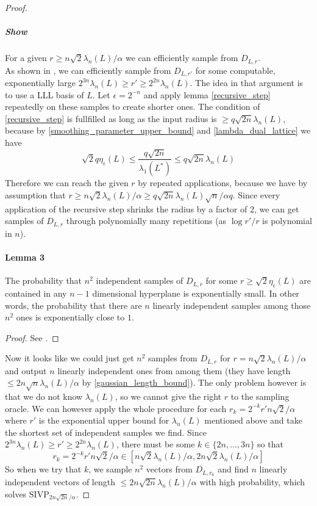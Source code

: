 \begin{proof}
\subparagraph{Show} For a given $r \geq n \sqrt{2}\lambda_n(L)/\alpha$ we can efficiently sample from $D_{L, r}$. \\
As shown in \cite{Reg}, we can efficiently sample from $D_{L, r'}$ for some computable, exponentially large $2^{3n}\lambda_n(L) \geq r' \geq 2^{2n} \lambda_n(L)$. The idea in that argument is to use a LLL basis of $L$. Let $\epsilon = 2^{-n}$ and apply lemma \ref{recursive_step} repeatedly on these samples to create shorter ones. The condition of \ref{recursive_step} is fullfilled as long as the input radius is $\geq q \sqrt{2n} \lambda_n(L)$, because by \ref{smoothing_parameter_upper_bound} and \ref{lambda_dual_lattice} we have
\begin{equation}
\sqrt{2}q\eta_\epsilon(L) \leq \frac {q \sqrt{2n}} {\lambda_1(L^*)} \leq q \sqrt{2n} \lambda_n(L) \nonumber
\end{equation}
Therefore we can reach the given $r$ by repeated applications, because we have by assumption that $r \geq n\sqrt{2}\lambda_n(L)/\alpha \geq q \sqrt{2n} \lambda_n(L) \sqrt{n}/\alpha q$.
Since every application of the recursive step shrinks the radius by a factor of $2$, we can get samples of $D_{L, r}$ through polynomially many repetitions (as $\log r'/r$ is polynomial in $n$).

\paragraph{Lemma 3} The probability that $n^2$ independent samples of $D_{L, r}$ for some $r \geq \sqrt{2}\eta_\epsilon(L)$ are contained in any $n-1$ dimensional hyperplane is exponentially small. In other words, the probability that there are $n$ linearly independent samples among those $n^2$ ones is exponentially close to $1$.

\begin{proof} \noqed
See \cite[3.16]{Reg}.
\end{proof}

Now it looks like we could just get $n^2$ samples from $D_{L, r}$ for $r = n\sqrt{2}\lambda_n(L)/\alpha$ and output $n$ linearly independent ones from among them (they have length $\leq 2n\sqrt{n}\lambda_n(L)/\alpha$ by \ref{gaussian_length_bound}). The only problem however is that we do not know $\lambda_n(L)$, so we cannot give the right $r$ to the sampling oracle. We can however apply the whole procedure for each $r_k = 2^{-k}r' n\sqrt{2}/\alpha$ where $r'$ is the exponential upper bound for $\lambda_n(L)$ mentioned above and take the shortest set of independent samples we find. Since $2^{3n}\lambda_n(L) \geq r' \geq 2^{2n} \lambda_n(L)$, there must be some $k \in \{ 2n, ..., 3n \}$ so that 
\begin{equation}
r_k = 2^{-k} r' n\sqrt{2}/\alpha \in \left[n \sqrt{2}\lambda_n(L)/\alpha, 2n \sqrt{2}\lambda_n(L)/\alpha \right] \nonumber
\end{equation}
So when we try that $k$, we sample $n^2$ vectors from $D_{L, r_k}$ and find $n$ linearly independent vectors of length $\leq 2n \sqrt{2n}\lambda_n(L)/\alpha$ with high probability, which solves $\mathrm{SIVP}_{2n\sqrt{2n}/\alpha}$. \qedhere
\end{proof}











